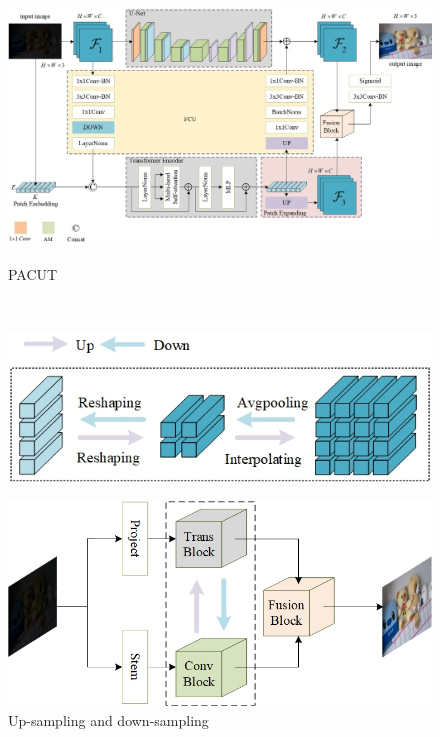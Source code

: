 \documentclass[CJK,aspectratio=169]{beamer}  %
\begin{document}
\begin{frame}
\begin{figure}
\begin{minipage}{.4\textwidth}
\begin{itemize}
				\end{itemize}
				\captionsetup{font=scriptsize}
				\label{fig: Abstract}
			\end{minipage}
			\begin{minipage}{.58\textwidth}
				\centering
				\includegraphics[width=.88\linewidth]{picture/LLIE/My Architecture/The proposed initial architecture.jpg}
				\captionsetup{font=scriptsize}
				\label{fig: PACUT}	
				\caption*{\tiny PACUT}
			\end{minipage}\\
			\hfill
			\begin{minipage}{.28\textwidth}
				\includegraphics[width=.88\linewidth]{picture/LLIE/My Architecture/Up-sampling and down-sampling.jpg}
				\captionsetup{font=scriptsize}
				\label{fig: Up-sampling and down-sampling}	
				\caption*{\tiny Up-sampling and down-sampling}
			\end{minipage}
			\begin{minipage}{.28\textwidth}
				\includegraphics[width=.88\linewidth]{picture/LLIE/My Architecture/The proposed initial architecture(Abstract Picture).jpg}

\end{minipage}
\end{figure}
\end{frame}
\end{document}
